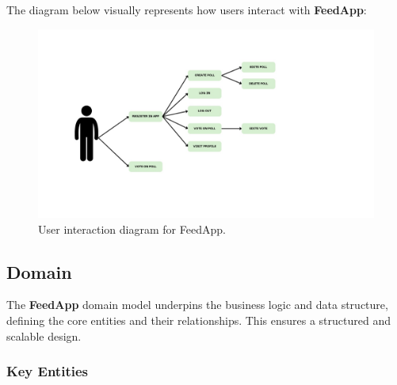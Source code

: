 The diagram below visually represents how users interact with \textbf{FeedApp}:

\begin{figure}[thb]
	\centering
	\includegraphics[scale=0.5]{figs/usecases.jpg}
	\caption{User interaction diagram for FeedApp.}
	\label{fig:feedapp_diagram}
\end{figure}


\subsection{Domain}

The \textbf{FeedApp} domain model underpins the business logic and data structure, defining the core entities and their relationships. This ensures a structured and scalable design.

\subsubsection{Key Entities}

